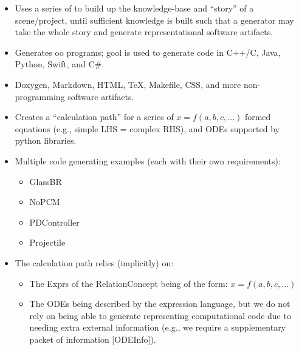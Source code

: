\caseStudiesCodeTable

\begin{itemize}

      \item Uses a series of  to build up the knowledge-base and
            ``story'' of a scene/project, until sufficient knowledge is built
            such that a generator may take the whole story and generate
            representational software artifacts.

      \item Generates \acs{oo} programs; \acs{gool} is used to generate code in
            C++/C, Java, Python, Swift, and C\#.

      \item Doxygen, Markdown, HTML, TeX, Makefile, CSS, and more
            non-programming software artifacts.

      \item Creates a ``calculation path'' for a series of $x = f(a,b,c,...)$
            formed equations (e.g., simple LHS = complex RHS), and ODEs
            supported by python libraries.

      \item Multiple code generating examples (each with their own
            requirements):
            \begin{itemize}
                  \item GlassBR
                  \item NoPCM
                  \item PDController
                  \item Projectile
            \end{itemize}

      \item The calculation path relies (implicitly) on:
            \begin{itemize}

                  \item The Exprs of the RelationConcept being of the form: $x =
                              f(a,b,c,...)$

                  \item The ODEs being described by the expression language, but
                        we do not rely on being able to generate representing
                        computational code due to needing extra external
                        information (e.g., we require a supplementary packet of
                        information [ODEInfo]).

            \end{itemize}

\end{itemize}

